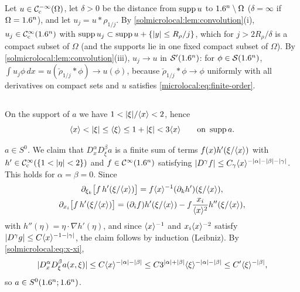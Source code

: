 \subsection*{}
Let $u\in\mathcal{C}^{-\infty}_{\mathrm{c}}(\Omega)$, let $\delta>0$ be the distance from $\operatorname{supp} u$ to $1.6^n\setminus\Omega$
($\delta=\infty$ if $\Omega=1.6^n$), and let $u_j=u*\rho_{1/j}$. By
\cref{solmicrolocal:lem:convolution}(i), $u_j\in\mathcal{C}^\infty_{\mathrm{c}}(1.6^n)$ with
$\operatorname{supp} u_j\subset\operatorname{supp} u+\{\lvert y\rvert\le R_\rho/j\}$, which for $j>2R_\rho/\delta$ is a compact subset of
$\Omega$ (and the supports lie in one fixed compact subset of $\Omega$). By
\cref{solmicrolocal:lem:convolution}(iii), $u_j\to u$ in $\mathcal{S}'(1.6^n)$: for $\phi\in\mathcal{S}(1.6^n)$,
$\int u_j\phi\,dx=u(\check\rho_{1/j}*\phi)\to u(\phi)$, because $\check\rho_{1/j}*\phi\to\phi$ uniformly
with all derivatives on compact sets and $u$ satisfies \eqref{microlocal:eq:finite-order}.

\subsection*{}
On the support of $a$ we have $1<\lvert \xi\rvert/\langle x\rangle<2$, hence
\begin{equation}\label{solmicrolocal:eq:x-xi}
  \langle x\rangle<\lvert \xi\rvert\le\langle \xi\rangle\le1+\lvert \xi\rvert<3\langle x\rangle\qquad\text{on }\operatorname{supp} a .
\end{equation}

\emph{$a\in S^0$.} We claim that $D^\alpha_xD^\beta_\xi a$ is a finite sum of terms
$f(x)h'(\xi/\langle x\rangle)$ with $h'\in\mathcal{C}^\infty_{\mathrm{c}}(\{1<\lvert \eta\rvert<2\})$ and $f\in\mathcal{C}^\infty(1.6^n)$ satisfying
$\lvert D^\gamma f\rvert\le C_\gamma\langle x\rangle^{-\lvert \alpha\rvert-\lvert \beta\rvert-\lvert \gamma\rvert}$. This holds for
$\alpha=\beta=0$. Since
\begin{gather*}
  \partial_{\xi_k}\bigl[f\,h'(\xi/\langle x\rangle)\bigr]=f\langle x\rangle^{-1}(\partial_kh')(\xi/\langle x\rangle),\\
  \partial_{x_i}\bigl[f\,h'(\xi/\langle x\rangle)\bigr]=(\partial_if)h'(\xi/\langle x\rangle)-f\frac{x_i}{\langle x\rangle^2}h''(\xi/\langle x\rangle),
\end{gather*}
with $h''(\eta)=\eta\cdot\nabla h'(\eta)$, and since $\langle x\rangle^{-1}$ and $x_i\langle x\rangle^{-2}$ satisfy
$\lvert D^\gamma g\rvert\le C\langle x\rangle^{-1-\lvert \gamma\rvert}$, the claim follows by induction (Leibniz). By
\eqref{solmicrolocal:eq:x-xi},
\begin{equation*}
  \lvert D^\alpha_xD^\beta_\xi a(x,\xi)\rvert\le C\langle x\rangle^{-\lvert \alpha\rvert-\lvert \beta\rvert}\le C3^{\lvert \alpha\rvert+\lvert \beta\rvert}
  \langle \xi\rangle^{-\lvert \alpha\rvert-\lvert \beta\rvert}\le C'\langle \xi\rangle^{-\lvert \beta\rvert},
\end{equation*}
so $a\in S^0(1.6^n;1.6^n)$.


